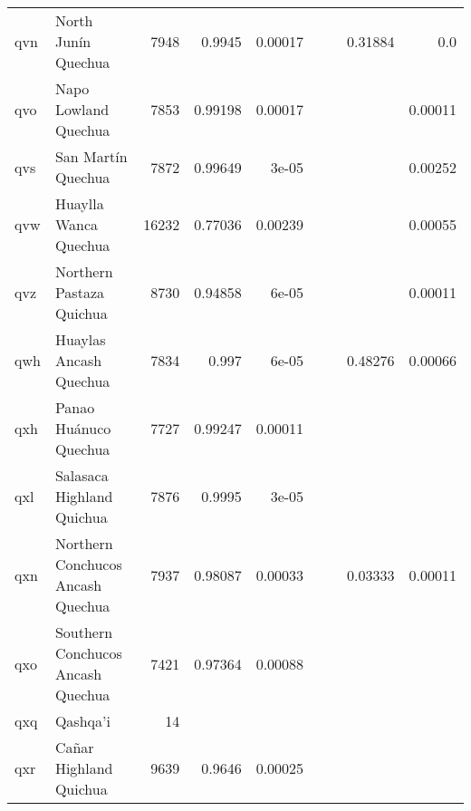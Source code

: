 \documentclass[11pt]{article}
\begin{document}
\begin{table*}[h]
{\begin{tabular}{llrrrrrrr}
qvn         & North Junín Quechua         & 7948         & 0.9945         & 0.00017         &          &          & 0.31884         & 0.0         \\

qvo         & Napo Lowland Quechua         & 7853         & 0.99198         & 0.00017         &          &          &          & 0.00011         \\

qvs         & San Martín Quechua         & 7872         & 0.99649         & 3e-05         &          &          &          & 0.00252         \\

qvw         & Huaylla Wanca Quechua         & 16232         & 0.77036         & 0.00239         &          &          &          & 0.00055         \\

qvz         & Northern Pastaza Quichua         & 8730         & 0.94858         & 6e-05         &          &          &          & 0.00011         \\

qwh         & Huaylas Ancash Quechua         & 7834         & 0.997         & 6e-05         &          &          & 0.48276         & 0.00066         \\

qxh         & Panao Huánuco Quechua         & 7727         & 0.99247         & 0.00011         &          &          &          &          \\

qxl         & Salasaca Highland Quichua         & 7876         & 0.9995         & 3e-05         &          &          &          &          \\

qxn         & Northern Conchucos Ancash Quechua         & 7937         & 0.98087         & 0.00033         &          &          & 0.03333         & 0.00011         \\

qxo         & Southern Conchucos Ancash Quechua         & 7421         & 0.97364         & 0.00088         &          &          &          &          \\

qxq         & Qashqa'i         & 14         &          &          &          &          &          &          \\

qxr         & Cañar Highland Quichua         & 9639         & 0.9646         & 0.00025         &          &          &          &          \\


\end{tabular}}
\end{table*}
\end{document}
